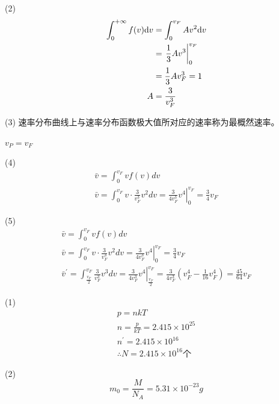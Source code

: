 (2)
\begin{align*}
\int _ { 0 } ^ {+\infty}f(v)\mathrm{d}v
&=\int _ { 0 } ^ {v_F}Av^2\mathrm{d}v\\
&=\left. \dfrac { 1 } { 3 } A v ^ { 3 } \right| _ { 0 } ^ { v _ { F } }\\
&=\dfrac { 1 } { 3 } A v_F^3= 1 \\ 
A&=\dfrac{3}{ v_F^3 }
\end{align*}

(3)
速率分布曲线上与速率分布函数极大值所对应的速率称为最概然速率。

\therefore$v_P=v_F$

(4)
\begin{gather*}
{ \bar { v } = \int _ { 0 } ^ { v _ { F } } v f ( v ) d v } \\
 { \bar { v } = \int _ { 0 } ^ { v _ { F } } v \cdot \frac { 3 } { v _ { F } ^ { 3 } } v ^ { 2 } d v = \left. \frac { 3 } { 4 v _ { F } ^ { 3 } } v ^ { 4 } \right| _ { 0 } ^ { v _ { F } } = \frac { 3 } { 4 } v _ { F } } 
\end{gather*}

(5)
\begin{gather*}
 { \bar { v } = \int _ { 0 } ^ { v _ { F } } v f ( v ) d v } \\
{ \bar { v } = \int _ { 0 } ^ { v _ { F } } v \cdot \frac { 3 } { v _ { F } ^ { 3 } } v ^ { 2 } d v = \left. \frac { 3 } { 4 v _ { F } ^ { 3 } } v ^ { 4 } \right| _ { 0 } ^ { v _ { F } } = \frac { 3 } { 4 } v _ { F } } \\ { \bar { v } ^ { \prime } = \int _ { \frac { v _ { F } } { 2 } } ^ { v _ { F } } \frac { 3 } { v _ { F } ^ { 3 } } v ^ { 3 } d v = \left. \frac { 3 } { 4 v _ { F } ^ { 3 } } v ^ { 4 } \right| _ { \frac { v _ { F } } { 2 } } ^ { v _ { F } } = \frac { 3 } { 4 v _ { F } ^ { 3 } } \left( v _ { F } ^ { 4 } - \frac { 1 } { 16 } v _ { F } ^ { 4 } \right) = \frac { 45 } { 64 } v _ { F } }
\end{gather*}


\solve
(1)
\begin{gather*}
{ p = n k T } \\ 
{ n = \frac { p } { k T } = 2.415 \times 10 ^ { 25 } } \\ 
{ n ^ { \prime } = 2.415 \times 10 ^ { 16 } } \\
 { \therefore N = 2.415 \times 10 ^ { 16 } \mbox{个} } 
\end{gather*}

(2)
$$
m _ { 0 } = \frac { M } { N _ { A } } = 5.31 \times 10 ^ { - 23 } g
$$

